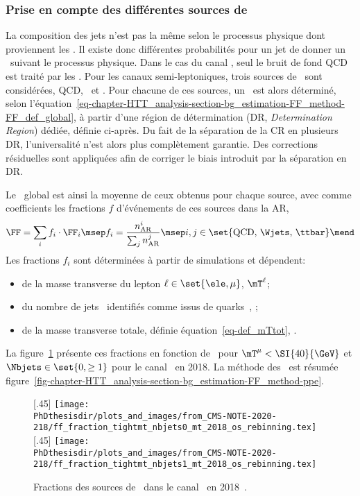 \subsubsection{Prise en compte des différentes sources de \ftauhs}
La composition des jets n'est pas la même selon le processus physique dont proviennent les \ftauhs.
Il existe donc différentes probabilités pour un jet de donner un \ftauh\ suivant le processus physique.
Dans le cas du canal \tauh\tauh, seul le bruit de fond QCD est traité par les \fakefactors.
Pour les canaux semi-leptoniques, trois sources de \ftauhs\ sont considérées, QCD, \Wjets\ et \ttbar.
Pour chacune de ces sources, un \fakefactor\ est alors déterminé, selon l'équation~\eqref{eq-chapter-HTT_analysis-section-bg_estimation-FF_method-FF_def_global}, à partir d'une région de détermination (DR, \emph{Determination Region}) dédiée, définie ci-après.
Du fait de la séparation de la CR en plusieurs DR, l'universalité n'est alors plus complètement garantie.
Des corrections résiduelles sont appliquées afin de corriger le biais introduit par la séparation en DR.
\par
Le \fakefactor\ global est ainsi la moyenne de ceux obtenus pour chaque source, avec comme coefficients les fractions $f$ d'événements de ces sources dans la AR, \ie
\begin{equation}
\FF = \sum_i f_i \cdot \FF_i
\msep
f_i = \frac{n_\text{AR}^i}{\sum_j n_\text{AR}^{j}}
\msep
i,j \in \set{\text{QCD, \Wjets, \ttbar}}
\mend
\end{equation}
Les fractions $f_i$ sont déterminées à partir de simulations et dépendent:
\begin{itemize}
\item de la masse transverse du lepton $\ell\in\set{\ele,\mu}$, $\mT^{\ell}$;
\item du nombre de jets \Nprebjets\ identifiés comme issus de quarks~\quarkb, \Nbjets;
\item de la masse transverse totale, définie équation~\eqref{eq-def_mTtot}, \mTtot.
\end{itemize}
La figure~\ref{fig-chapter-HTT_analysis-section-bg_estimation-FF_method-fractions} présente ces fractions en fonction de \mTtot\ pour $\mT^{\mu} < \SI{40}{\GeV}$ et $\Nbjets\in\set{0,\geq1}$ pour le canal \mu\tauh\ en 2018.
La méthode des \fakefactors\ est résumée figure~\ref{fig-chapter-HTT_analysis-section-bg_estimation-FF_method-ppe}.
\begin{figure}[h]
\centering

[.45\textwidth]
{\texttt{[image: \\PhDthesisdir/plots\_and\_images/from\_CMS-NOTE-2020-218/ff\_fraction\_tightmt\_nbjets0\_mt\_2018\_os\_rebinning.tex]}}
\hfill
{}[.45\textwidth]
{\texttt{[image: \\PhDthesisdir/plots\_and\_images/from\_CMS-NOTE-2020-218/ff\_fraction\_tightmt\_nbjets1\_mt\_2018\_os\_rebinning.tex]}}

\caption[Fractions des sources de \ftauhs\ dans le canal \mu\tauh\ en 2018.]{Fractions des sources de \ftauhs\ dans le canal \mu\tauh\ en 2018~\cite{CMS-NOTE-2020-218}.}
\label{fig-chapter-HTT_analysis-section-bg_estimation-FF_method-fractions}
\end{figure}
